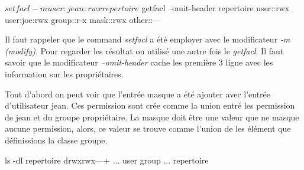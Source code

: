 \begin{verbatin}
$ setfacl -m user:jean:rwx repertoire
$ getfacl --omit-header repertoire user::rwx user:joe:rwx	
	group::r-x mask::rwx other::---
\end{verbatin}

Il faut rappeler que le command \emph{setfacl} a été employer avec le modificateur \emph{-m (modify)}. Pour regarder les résultat on utilisé une autre fois le \emph{getfacl}. Il faut savoir que le modificateur \emph{--omit-header} cache les première 3 ligne avec les information sur les propriétaires.  

Tout d'abord on peut voir que l'entrée masque a été ajouter avec l'entrée d'utilisateur jean. Ces permission sont crée comme la union entré les permission de jean et du groupe propriétaire. La masque doit être une valeur que ne masque aucune permission, alors, ce valeur se trouve comme l'union de les élément que définissions la classe groupe.  

\begin{verbatin}
ls -dl repertoire
	drwxrwx---+ ... user group ... repertoire
\end{verbatin}


